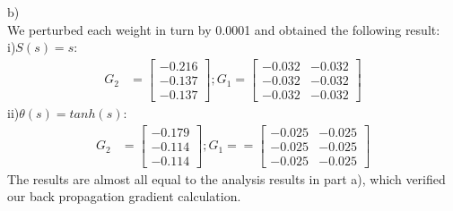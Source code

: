 \documentclass[12pt]{article}
\newcommand{\D}{\displaystyle}
\begin{document}
b)\\ 
\indent We perturbed each weight in turn by 0.0001 and obtained the following result:\\
i)\indent $S(s) = s$:
\begin{align*} \D
G_2 &=  \begin{bmatrix} -0.216\\ -0.137\\ -0.137 \end{bmatrix}; G_1= \begin{bmatrix} -0.032 & -0.032\\ -0.032 & -0.032\\ -0.032 & -0.032 \end{bmatrix} 
\end{align*}
ii)\indent $\theta(s) = tanh(s)$:
\begin{align*} \D
G_2 &=  \begin{bmatrix} -0.179\\ -0.114\\ -0.114 \end{bmatrix}; G_1= =\begin{bmatrix} -0.025 & -0.025\\ -0.025 & -0.025\\ -0.025 & -0.025 \end{bmatrix} 
\end{align*}
\indent The results are almost all equal to the analysis results in part a), which verified our back propagation gradient calculation.
\end{document}
